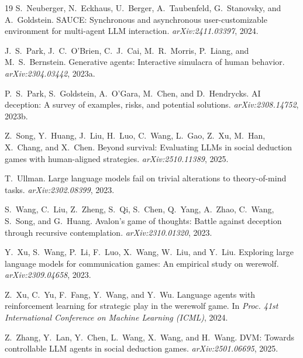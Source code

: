 \documentclass{article}
\begin{document}
\begin{thebibliography}{19}
 S.~Neuberger, N.~Eckhaus, U.~Berger, A.~Taubenfeld, G.~Stanovsky, and A.~Goldstein. SAUCE: Synchronous and asynchronous user-customizable environment for multi-agent LLM interaction. \textit{arXiv:2411.03397}, 2024.

 J.~S.~Park, J.~C.~O'Brien, C.~J.~Cai, M.~R.~Morris, P.~Liang, and M.~S.~Bernstein. Generative agents: Interactive simulacra of human behavior. \textit{arXiv:2304.03442}, 2023a.

 P.~S.~Park, S.~Goldstein, A.~O'Gara, M.~Chen, and D.~Hendrycks. AI deception: A survey of examples, risks, and potential solutions. \textit{arXiv:2308.14752}, 2023b.

 Z.~Song, Y.~Huang, J.~Liu, H.~Luo, C.~Wang, L.~Gao, Z.~Xu, M.~Han, X.~Chang, and X.~Chen. Beyond survival: Evaluating LLMs in social deduction games with human-aligned strategies. \textit{arXiv:2510.11389}, 2025.

 T.~Ullman. Large language models fail on trivial alterations to theory-of-mind tasks. \textit{arXiv:2302.08399}, 2023.

 S.~Wang, C.~Liu, Z.~Zheng, S.~Qi, S.~Chen, Q.~Yang, A.~Zhao, C.~Wang, S.~Song, and G.~Huang. Avalon's game of thoughts: Battle against deception through recursive contemplation. \textit{arXiv:2310.01320}, 2023.

 Y.~Xu, S.~Wang, P.~Li, F.~Luo, X.~Wang, W.~Liu, and Y.~Liu. Exploring large language models for communication games: An empirical study on werewolf. \textit{arXiv:2309.04658}, 2023.

 Z.~Xu, C.~Yu, F.~Fang, Y.~Wang, and Y.~Wu. Language agents with reinforcement learning for strategic play in the werewolf game. In \textit{Proc. 41st International Conference on Machine Learning (ICML)}, 2024.

 Z.~Zhang, Y.~Lan, Y.~Chen, L.~Wang, X.~Wang, and H.~Wang. DVM: Towards controllable LLM agents in social deduction games. \textit{arXiv:2501.06695}, 2025.

\end{thebibliography}
\end{document}

